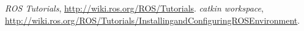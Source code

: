 \begin{thebibliography}{99}
    
 \textit{ROS Tutorials}, \url{http://wiki.ros.org/ROS/Tutorials}.
 \textit{catkin workspace}, \\
\url{http://wiki.ros.org/ROS/Tutorials/InstallingandConfiguringROSEnvironment}.
    
\end{thebibliography}